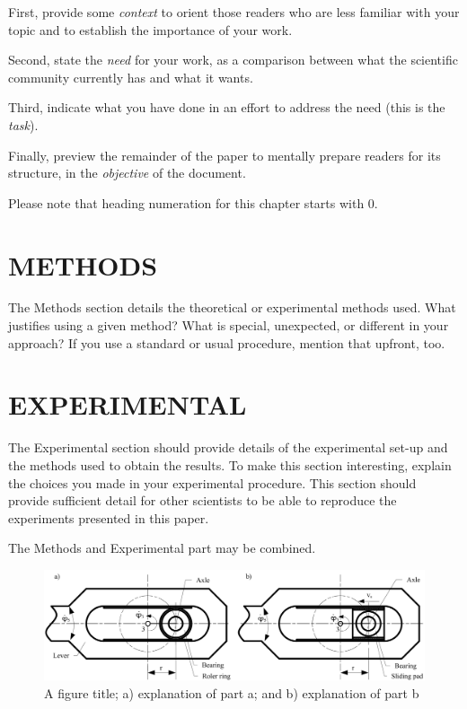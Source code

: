 \documentclass[10pt]{JoME}
\begin{document}
First, provide some \emph{context} to orient those readers who are less familiar with your topic and to establish the importance of your work.

Second, state the \emph{need} for your work, as a comparison between what the scientific community currently has and what it wants.

Third, indicate what you have done in an effort to address the need (this is the \emph{task}).

Finally, preview the remainder of the paper to mentally prepare readers for its structure, in the \emph{objective} of the document.

Please note that heading numeration for this chapter starts with 0.

\section{METHODS}

The Methods section details the theoretical or experimental methods used. What justifies using a given method? What is special, unexpected, or different in your approach? If you use a standard or usual procedure, mention that upfront, too.


\section{EXPERIMENTAL}

The Experimental section should provide details of the experimental set-up and the methods used to obtain the results. To make this section interesting, explain the choices you made in your experimental procedure. This section should provide sufficient detail for other scientists to be able to reproduce the experiments presented in this paper.

The Methods and Experimental part may be combined. 

\begin{figure}
\includegraphics[width=161mm]{fig1.png}
\caption{A figure title; a) explanation of part a; and b) explanation of part b\label{figA}}
\end{figure}
\end{document}
